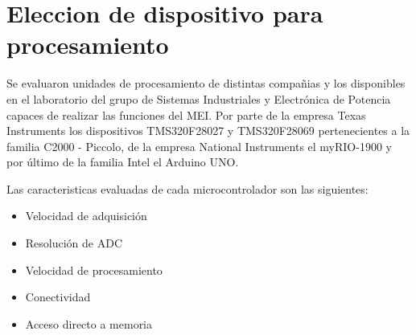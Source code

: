\section{Eleccion de dispositivo para procesamiento}%
\par Se evaluaron unidades de procesamiento de distintas compañias y los
disponibles en el laboratorio del grupo de Sistemas Industriales y Electrónica
de Potencia capaces de realizar las funciones del MEI. Por parte de la empresa
Texas Instruments los dispositivos TMS320F28027 y TMS320F28069 pertenecientes
a la familia C2000 - Piccolo, de la empresa National Instruments el myRIO-1900
y por último de la familia Intel el Arduino UNO.

Las caracteristicas evaluadas de cada microcontrolador son las siguientes:
\begin{itemize}
  \item Velocidad de adquisición
  \item Resolución de ADC
  \item Velocidad de procesamiento
  \item Conectividad
  \item Acceso directo a memoria
\end{itemize}

\begin{table}[H]
\centering
\caption{\label{Especificaciones_dispositivos_comerciales_evaluados}Especificaciones de los dispositivos comerciales evaluados}
\end{table}

